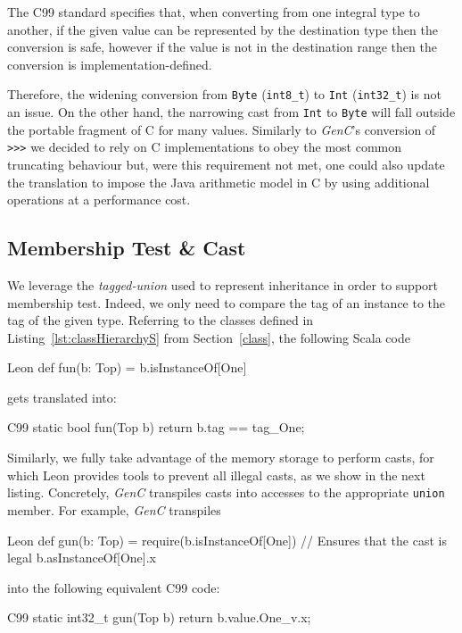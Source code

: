\documentclass[a4paper,twoside]{article}
\newcommand{\InlineC}[1]{\lstinline[language=C99]|#1|}
\newcommand{\InlineS}[1]{\lstinline[language=Leon]|#1|}
\newcommand{\GenC}{\emph{GenC}\xspace}
\newcommand{\RefSec}[1]{Section~\ref{#1}}
\newcommand{\RefCode}[1]{Listing~\ref{#1}}
\begin{document}
The C99 standard specifies that, when converting from one integral type to
another, if the given value can be represented by the destination type then the
conversion is safe, however if the value is not in the destination range then
the conversion is implementation-defined.

Therefore, the widening conversion from \InlineS{Byte} (\InlineC{int8_t}) to
\InlineS{Int} (\InlineC{int32_t}) is not an issue. On the other hand, the
narrowing cast from \InlineS{Int} to \InlineS{Byte} will fall outside the
portable fragment of C for many values. Similarly to \GenC's conversion of
\InlineS{>>>} we decided to rely on C implementations to obey the most common
truncating behaviour but, were this requirement not met, one could also update
the translation to impose the Java arithmetic model in C by using additional
operations at a performance cost.

\subsection{Membership Test \& Cast}

We leverage the \emph{tagged-union} used to represent inheritance in order to
support membership test. Indeed, we only need to compare the tag of an instance
to the tag of the given type. Referring to the classes defined in
\RefCode{lst:classHierarchyS} from \RefSec{class}, the following Scala code
\begin{ShortCode}{Leon}
def fun(b: Top) = b.isInstanceOf[One]
\end{ShortCode}
gets translated into:
\begin{ShortCode}{C99}
static bool fun(Top b) { return b.tag == tag_One; }
\end{ShortCode}

Similarly, we fully take advantage of the memory storage to perform casts, for
which Leon provides tools to prevent all illegal casts, as we show in the next
listing. Concretely, \GenC transpiles casts into accesses to the appropriate
\InlineC{union} member. For example, \GenC transpiles
\begin{ShortCode}{Leon}
def gun(b: Top) = {
  require(b.isInstanceOf[One]) // Ensures that the cast is legal
  b.asInstanceOf[One].x
}
\end{ShortCode}
into the following equivalent C99 code:
\begin{ShortCode}{C99}
static int32_t gun(Top b) { return b.value.One_v.x; }
\end{ShortCode}
\end{document}
